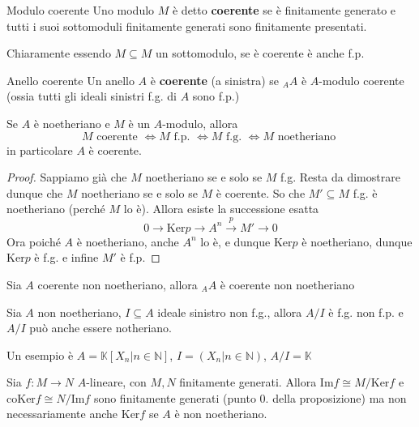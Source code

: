 \begin{definition}{Modulo coerente}
    Uno modulo \(M\) è detto \textbf{coerente} se è finitamente generato e tutti
    i suoi sottomoduli finitamente generati sono finitamente presentati.
\end{definition}
\begin{remark}{}
    Chiaramente essendo \(M \subseteq M \) un sottomodulo, se è coerente è anche
    f.p.
\end{remark}
\begin{definition}{Anello coerente}
    Un anello \(A\) è \textbf{coerente} (a sinistra) se \(_AA\) è \(A\)-modulo
    coerente (ossia tutti gli ideali sinistri f.g. di \(A\) sono f.p.)
\end{definition}
\begin{remark}{}
    Se \(A\) è noetheriano e \(M\) è un \(A\)-modulo, allora
    \[
      M \text{ coerente } \iff M \text{ f.p. } \iff M \text{ f.g. } \iff M
      \text{ noetheriano }
    \]
    in particolare \(A\) è coerente. 
\end{remark}
\begin{proof}{}
    Sappiamo già che \(M\) noetheriano se e solo se \(M\) f.g. Resta da
    dimostrare dunque che \(M\) noetheriano se e solo se \(M\) è coerente. So
    che \(M' \subseteq M \) f.g. è noetheriano (perché \(M\) lo è). Allora esiste la successione esatta 
    \[
      0 \to \mathrm{Ker} p \to A^{n} \overset{p}{\to } M' \to 0
    \]
    Ora poiché \(A\) è noetheriano, anche \(A^{n}\) lo è, e dunque \(\mathrm{Ker} p \) è noetheriano, dunque \(\mathrm{Ker}p\) è f.g. e infine \(M'\) è f.p.
\end{proof}
\begin{remark}{}
    Sia \(A\) coerente non noetheriano, allora \(_AA\) è coerente non
    noetheriano
\end{remark}
\begin{example}{}
    Sia \(A\) non noetheriano, \(I \subseteq A \) ideale sinistro non f.g.,
    allora \(A/I\) è f.g. non f.p. e \(A / I\) può anche essere notheriano.

    Un esempio è \(A = \mathbb{K}[X_n | n \in \mathbb{N}]\), \(I = {(X_n | n \in \mathbb{N})}\), \(A / I = \mathbb{K}\) 

\end{example}

\begin{remark}{}
    Sia \(f : M \to N\) \(A\)-lineare, con \(M, N\) finitamente generati. Allora
    \(\mathrm{Im} f \cong M / \mathrm{Ker} f\) e \(\mathrm{coKer} f \cong N / \mathrm{Im} f \)
    sono finitamente generati (punto 0. della proposizione) ma non
    necessariamente anche \(\mathrm{Ker} f\) se \(A\) è non noetheriano.
\end{remark}


